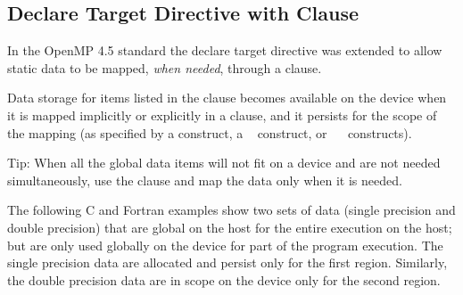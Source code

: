 \subsection{Declare Target Directive with  Clause}
\label{subsec:declare_target_link}




In the OpenMP 4.5 standard the declare target directive was extended to allow static
data to be mapped, \emph{when needed}, through a  clause.

Data storage for items listed in the  clause becomes available on the device
when it is mapped implicitly or explicitly in a  clause, and it persists for the scope of
the mapping (as specified by a  construct, 
a ~ construct, or 
~~ constructs).

Tip: When all the global data items will not fit on a device and are not needed
simultaneously, use the  clause and map the data only when it is needed.

The following C and Fortran examples show two sets of data (single precision and double precision)
that are global on the host for the entire execution on the host; but are only used
globally on the device for part of the program execution. The single precision data
are allocated and persist only for the first  region. Similarly, the
double precision data are in scope on the device only for the second  region.


